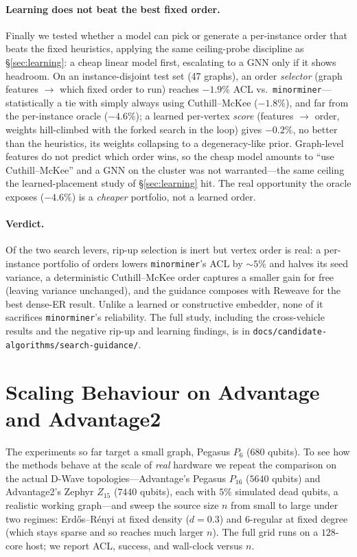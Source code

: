 \documentclass[acmsmall,anonymous,nonacm]{acmart}
\begin{document}
\paragraph{Learning does not beat the best fixed order.}
Finally we tested whether a model can pick or generate a per-instance order that
beats the fixed heuristics, applying the same ceiling-probe discipline as
\S\ref{sec:learning}: a cheap linear model first, escalating to a GNN only if it
shows headroom. On an instance-disjoint test set (47 graphs), an order
\emph{selector} (graph features $\rightarrow$ which fixed order to run) reaches
$-1.9\%$ ACL vs.\ \texttt{minorminer}---statistically a tie with simply always
using Cuthill--McKee ($-1.8\%$), and far from the per-instance oracle ($-4.6\%$);
a learned per-vertex \emph{score} (features $\rightarrow$ order, weights
hill-climbed with the forked search in the loop) gives $-0.2\%$, no better than the
heuristics, its weights collapsing to a degeneracy-like prior. Graph-level features
do not predict which order wins, so the cheap model amounts to ``use
Cuthill--McKee'' and a GNN on the cluster was not warranted---the same ceiling the
learned-placement study of \S\ref{sec:learning} hit. The real opportunity the
oracle exposes ($-4.6\%$) is a \emph{cheaper} portfolio, not a learned order.

\paragraph{Verdict.} Of the two search levers, rip-up selection is inert but vertex
order is real: a per-instance portfolio of orders lowers \texttt{minorminer}'s ACL
by ${\sim}5\%$ and halves its seed variance, a deterministic Cuthill--McKee order
captures a smaller gain for free (leaving variance unchanged), and the guidance
composes with Reweave for the best dense-ER result. Unlike a learned or
constructive embedder, none of it sacrifices \texttt{minorminer}'s reliability. The full
study, including the cross-vehicle results and the negative rip-up and learning
findings, is in \texttt{docs/candidate-algorithms/search-guidance/}.

\section{Scaling Behaviour on Advantage and Advantage2}
\label{sec:scaling}

The experiments so far target a small graph, Pegasus $P_6$ ($680$ qubits). To see
how the methods behave at the scale of \emph{real} hardware we repeat the
comparison on the actual D-Wave topologies---Advantage's Pegasus $P_{16}$
($5640$ qubits) and Advantage2's Zephyr $Z_{15}$ ($7440$ qubits), each with $5\%$
simulated dead qubits, a realistic working graph---and sweep the source size $n$
from small to large under two regimes: Erd\H{o}s--R\'enyi at fixed density
($d{=}0.3$) and $6$-regular at fixed degree (which stays sparse and so reaches much
larger $n$). The full grid runs on a $128$-core host; we report ACL, success, and
wall-clock versus $n$.
\end{document}
